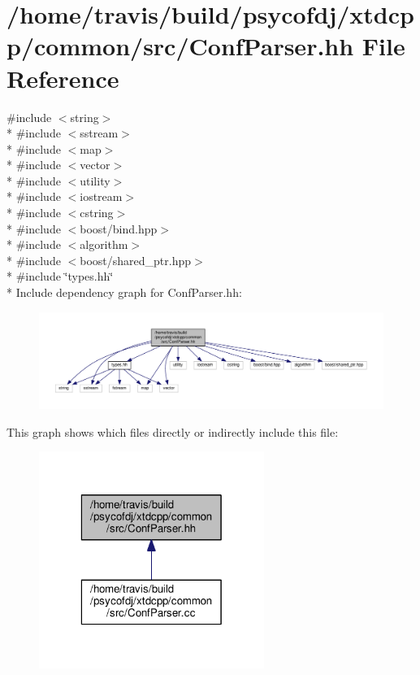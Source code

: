 \hypertarget{ConfParser_8hh}{\section{/home/travis/build/psycofdj/xtdcpp/common/src/\-Conf\-Parser.hh File Reference}
\label{ConfParser_8hh}
}
{\ttfamily \#include $<$string$>$}\\*
{\ttfamily \#include $<$sstream$>$}\\*
{\ttfamily \#include $<$map$>$}\\*
{\ttfamily \#include $<$vector$>$}\\*
{\ttfamily \#include $<$utility$>$}\\*
{\ttfamily \#include $<$iostream$>$}\\*
{\ttfamily \#include $<$cstring$>$}\\*
{\ttfamily \#include $<$boost/bind.\-hpp$>$}\\*
{\ttfamily \#include $<$algorithm$>$}\\*
{\ttfamily \#include $<$boost/shared\-\_\-ptr.\-hpp$>$}\\*
{\ttfamily \#include \char`\"{}types.\-hh\char`\"{}}\\*
Include dependency graph for Conf\-Parser.\-hh\-:
\nopagebreak
\begin{figure}[H]
\begin{center}
\leavevmode
\includegraphics[width=350pt]{ConfParser_8hh__incl}
\end{center}
\end{figure}
This graph shows which files directly or indirectly include this file\-:
\nopagebreak
\begin{figure}[H]
\begin{center}
\leavevmode
\includegraphics[width=208pt]{ConfParser_8hh__dep__incl}
\end{center}
\end{figure}
